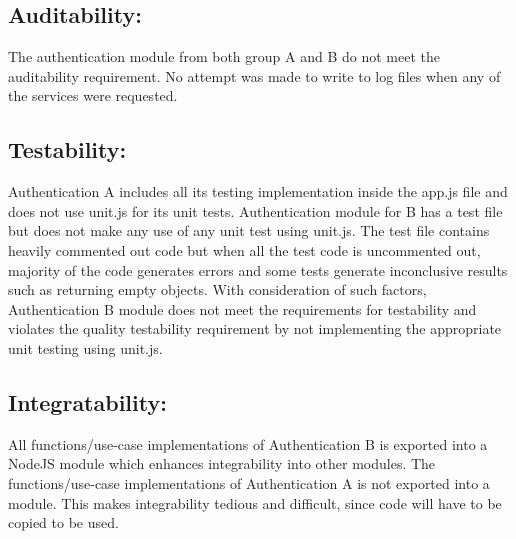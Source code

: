 \subsection{Auditability:}
The authentication module from both group A and B do not meet the auditability requirement. No attempt was made to write to log files when any of the services were requested.

\subsection{Testability:}
Authentication A includes all its testing implementation inside the app.js file and does not use unit.js for its unit tests.  
Authentication module for B has a test file but does not make any use of any unit test using unit.js. The test file contains heavily commented out code but when all the test code is uncommented out, majority of the code generates errors and some tests generate inconclusive results such as returning empty objects. With consideration of such factors, Authentication B module does not meet the requirements for testability and violates the quality testability requirement by not implementing the appropriate unit testing using unit.js.

\subsection{Integratability:}
All functions/use-case implementations of Authentication B is exported into a NodeJS module which enhances integrability into other modules.
The functions/use-case implementations of Authentication A is not exported into a module. This makes integrability tedious and difficult, since code will have to be copied to be used.